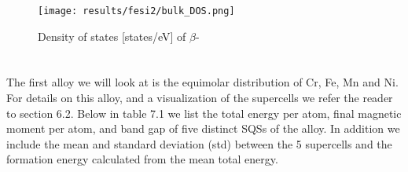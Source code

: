 \begin{figure}[H]
\centering
\texttt{[image: results/fesi2/bulk\_DOS.png]}
\caption{Density of states [states/eV] of $\beta$-}
\end{figure}
 

\section{}
The first alloy we will look at is the equimolar distribution of Cr, Fe, Mn and Ni. For details on this alloy, and a visualization of the supercells we refer the reader to section 6.2. Below in table 7.1 we list the total energy per atom, final magnetic moment per atom, and band gap of five distinct SQSs of the  alloy. In addition we include the mean and standard deviation (std) between the 5 supercells and the formation energy calculated from the mean total energy. 
 
